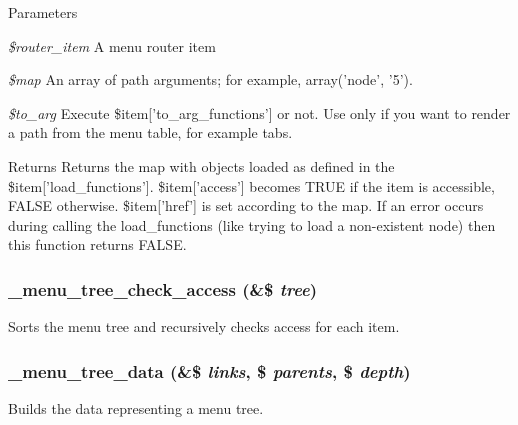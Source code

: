 \begin{DoxyParams}{Parameters}
\item[{\em \$router\_\-item}]A menu router item \item[{\em \$map}]An array of path arguments; for example, array('node', '5'). \item[{\em \$to\_\-arg}]Execute \$item\mbox{[}'to\_\-arg\_\-functions'\mbox{]} or not. Use only if you want to render a path from the menu table, for example tabs.\end{DoxyParams}
\begin{DoxyReturn}{Returns}
Returns the map with objects loaded as defined in the \$item\mbox{[}'load\_\-functions'\mbox{]}. \$item\mbox{[}'access'\mbox{]} becomes TRUE if the item is accessible, FALSE otherwise. \$item\mbox{[}'href'\mbox{]} is set according to the map. If an error occurs during calling the load\_\-functions (like trying to load a non-\/existent node) then this function returns FALSE. 
\end{DoxyReturn}
\hypertarget{group__menu_gad59ba7ae64f452408201f82f8cb7dc25}{
\subsubsection[{\_\-menu\_\-tree\_\-check\_\-access}]{\setlength{\rightskip}{0pt plus 5cm}\_\-menu\_\-tree\_\-check\_\-access (\&\$ {\em tree})}}
\label{group__menu_gad59ba7ae64f452408201f82f8cb7dc25}
Sorts the menu tree and recursively checks access for each item. \hypertarget{group__menu_gaf179327ae18d3a8ace0453b528707e3e}{
\subsubsection[{\_\-menu\_\-tree\_\-data}]{\setlength{\rightskip}{0pt plus 5cm}\_\-menu\_\-tree\_\-data (\&\$ {\em links}, \/  \$ {\em parents}, \/  \$ {\em depth})}}
\label{group__menu_gaf179327ae18d3a8ace0453b528707e3e}
Builds the data representing a menu tree.

